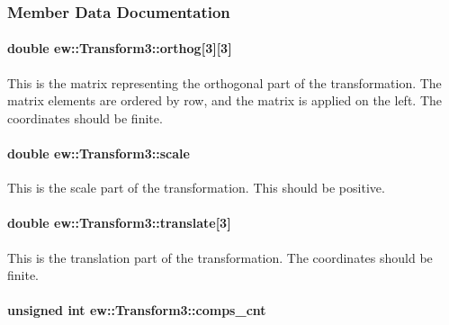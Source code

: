 \subsubsection{Member Data Documentation}
\hypertarget{classew_1_1Transform3_abbb79dd74876557bc765a54e115c4f66}{
\paragraph[{orthog}]{\setlength{\rightskip}{0pt plus 5cm}double {\bf ew::Transform3::orthog}\mbox{[}3\mbox{]}\mbox{[}3\mbox{]}}\hfill}
\label{classew_1_1Transform3_abbb79dd74876557bc765a54e115c4f66}
This is the matrix representing the orthogonal part of the transformation. The matrix elements are ordered by row, and the matrix is applied on the left. The coordinates should be finite. \hypertarget{classew_1_1Transform3_a27f775e77a4563a8f26f3131be6ed1fd}{
\paragraph[{scale}]{\setlength{\rightskip}{0pt plus 5cm}double {\bf ew::Transform3::scale}}\hfill}
\label{classew_1_1Transform3_a27f775e77a4563a8f26f3131be6ed1fd}
This is the scale part of the transformation. This should be positive. \hypertarget{classew_1_1Transform3_afb7de921c22991010272eb3cea8ddc70}{
\paragraph[{translate}]{\setlength{\rightskip}{0pt plus 5cm}double {\bf ew::Transform3::translate}\mbox{[}3\mbox{]}}\hfill}
\label{classew_1_1Transform3_afb7de921c22991010272eb3cea8ddc70}
This is the translation part of the transformation. The coordinates should be finite. \hypertarget{classew_1_1Transform3_ad2ca5cecae4fe2dfbc8b862b42891991}{
\paragraph[{comps\_\-cnt}]{\setlength{\rightskip}{0pt plus 5cm}unsigned int {\bf ew::Transform3::comps\_\-cnt}}\hfill}
